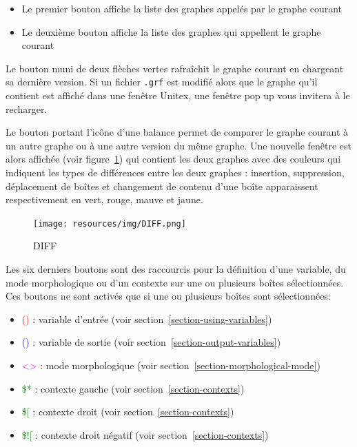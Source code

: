 \begin{itemize}
\item Le premier bouton affiche la liste des graphes appelés par le graphe courant
\item Le deuxième bouton affiche la liste des graphes qui appellent le graphe courant
\end{itemize}

\noindent Le bouton muni de deux flèches vertes rafraîchit le graphe courant en chargeant sa dernière version.
Si un fichier \verb+.grf+ est modifié alors que le graphe qu'il contient est affiché dans
une fenêtre Unitex, une fenêtre pop up vous invitera à le recharger.

\bigskip
\noindent Le bouton portant l'icône d'une balance permet de comparer le graphe courant à un autre
graphe ou à une autre version du même graphe. Une nouvelle fenêtre est alors affichée (voir
	figure~\ref{Graph-DIFF}) qui contient les deux graphes avec des couleurs qui indiquent les types de différences entre les deux graphes : insertion, suppression,
déplacement de boîtes et changement de contenu d'une boîte apparaissent respectivement en vert,
rouge, mauve et jaune.

\begin{figure}[!ht]
\begin{center}
\texttt{[image: resources/img/DIFF.png]}
\caption{DIFF\label{Graph-DIFF}}
\end{center}
\end{figure}

\bigskip
\noindent
Les six derniers boutons sont des raccourcis pour la définition d'une variable, du mode morphologique
ou d'un contexte sur une ou plusieurs boîtes sélectionnées. Ces boutons ne sont activés que si une  ou plusieurs boîtes sont sélectionnées:
\begin{itemize}
\item \textcolor{red}{()}  : variable d'entrée	(voir section~\ref{section-using-variables})
\item \textcolor{blue}{()} : variable de sortie (voir section~\ref{section-output-variables})
\item \textcolor{magenta}{<>} : mode morphologique (voir section~\ref{section-morphological-mode})
\item \textcolor{green}{\$*} : contexte gauche (voir section~\ref{section-contexts})
\item \textcolor{green}{\$[} : contexte droit (voir section~\ref{section-contexts})
\item \textcolor{green}{\$![} : contexte droit négatif (voir section~\ref{section-contexts})
\end{itemize}

